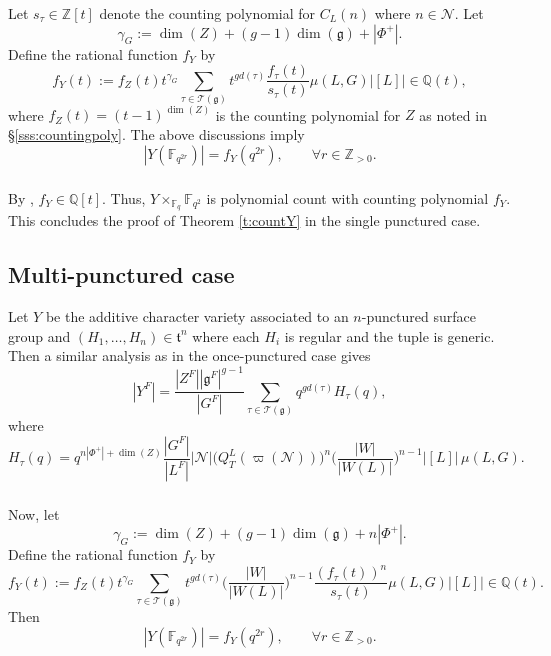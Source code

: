 \documentclass[12pt]{amsart}
\theoremstyle{plain}
\theoremstyle{definition}
\theoremstyle{remark}
\newcommand{\bY}{{Y}}
\newcommand{\cT}{\mathcal{T}}
\newcommand{\cN}{\mathcal{N}}
\newcommand{\Fq}{\mathbb{F}_q}
\newcommand{\fg}{\mathfrak{g}}
\newcommand{\ft}{\mathfrak{t}}
\begin{document}
\subsubsection{} Let $s_\tau \in \mathbb{Z}[t]$ denote the counting polynomial for $C_{L}(n)$ where $n\in \cN$. Let 
\[
\gamma_G:=  \dim(Z)+(g-1)\dim(\fg)+|\Phi^+|. 
\]
Define the rational function $f_Y$ by 
\[
f_Y(t):=f_Z(t)t^{\gamma_G} \sum_{\tau \in \cT(\fg)} t^{gd(\tau)}
 \frac{f_\tau(t)}{s_\tau(t)} \mu(L,G)  |[L]| \in \mathbb{Q}(t), 
\]
where $f_Z(t)= (t-1)^{\dim(Z)}$ is the counting polynomial for $Z$ as noted in \S\ref{sss:countingpoly}.
The above discussions imply 
\[
|Y(\mathbb{F}_{q^{2r}})| = f_Y(q^{2r}),\qquad \forall r\in \mathbb{Z}_{>0}. 
\]


\subsubsection{} By \cite[Lemma 2.11]{GoodwinRohrle}, $f_Y\in \mathbb{Q}[t]$. 
Thus, $Y\times_{\Fq} \mathbb{F}_{q^2}$ is polynomial count with counting polynomial $f_Y$.   This concludes the proof of Theorem \ref{t:countY} in the single punctured case.  



\subsection{Multi-punctured case}\label{s:countYPrecise} 
Let $\bY$ be the additive character variety associated to an $n$-punctured surface group   and  $(H_1,\ldots, H_n)\in \ft^n$ where each $H_i$ is regular and the tuple is generic.  Then a similar analysis as in the once-punctured case gives 
\[
|\bY^F| =  \frac{|Z^F||\fg^F|^{g-1}}{|G^F|} \sum_{\tau \in \cT(\fg)} q^{gd(\tau)} H_\tau(q),
\]
where 
\[
H_\tau(q)=  q^{n|\Phi^+|+\dim(Z)}\frac{|G^F|}{|L^F|}|\cN|\Big(Q_{T}^{L}(\varpi(\cN))\Big)^n  \bigg(\frac{|W|}{|W(L)|}\bigg)^{n-1}   |[L]|\,  \mu(L,G).
\]

\subsubsection{} 
Now, let  
\[
\gamma_G :=  \dim(Z)+(g-1)\dim(\fg)+n|\Phi^+|. 
\]
Define the rational function $f_Y$ by 
\[
f_Y(t):=f_Z(t)t^{\gamma_G} \sum_{\tau \in \cT(\fg)}t^{gd(\tau)} \bigg(\frac{|W|}{|W(L)|}\bigg)^{n-1} 
 \frac{(f_\tau(t))^n}{s_\tau(t)} \mu(L,G)  |[L]| \in \mathbb{Q}(t). 
\]
Then 
\[
|Y(\mathbb{F}_{q^{2r}})| = f_Y(q^{2r}),\qquad \forall r\in \mathbb{Z}_{>0}. 
\]
\end{document}
